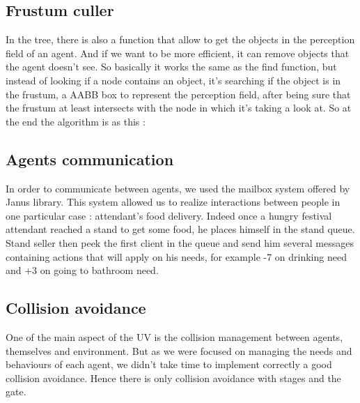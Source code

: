 \begin{algorithm}[H]
\end{algorithm}

\subsection{Frustum culler}

In the tree, there is also a function that allow to get the objects in the
perception field of an agent. And if we want to be more efficient, it can remove
objects that the agent doesn’t see. So basically it works the same as the find
function, but instead of looking if a node contains an object, it’s searching if
the object is in the frustum, a AABB box to represent the perception field,
after being sure that the frustum at least intersects with the node in which
it’s taking a look at. So at the end the algorithm is as this :\\

\begin{algorithm}[H]
\end{algorithm}

\subsection{Agents communication}

In order to communicate between agents, we used the mailbox system offered by
Janus library. This system allowed us to realize interactions between people in
one particular case : attendant’s food delivery. Indeed once a hungry festival
attendant reached a stand to get some food, he places himself in the stand
queue. Stand seller then peek the first client in the queue and send him several
messages containing actions that will apply on his needs, for example -7 on
drinking need and +3 on going to bathroom need.

\subsection{Collision avoidance}

One of the main aspect of the UV is the collision management between agents,
themselves and environment. But as we were focused on managing the needs and
behaviours of each agent, we didn’t take time to implement correctly a good
collision avoidance. Hence there is only collision avoidance with stages and the
gate.\\

